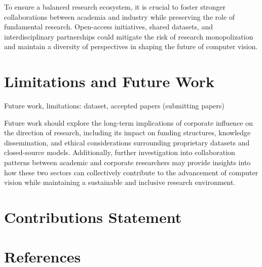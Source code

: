 \documentclass{article}
\begin{document}
To ensure a balanced research ecosystem, it is crucial to foster stronger collaborations between academia and industry while preserving the role of fundamental research. Open-access initiatives, shared datasets, and interdisciplinary partnerships could mitigate the risk of research monopolization and maintain a diversity of perspectives in shaping the future of computer vision. 

\section{Limitations and Future Work}

Future work, 
limitations: dataset, accepted papers (submitting papers)

Future work should explore the long-term implications of corporate influence on the direction of research, including its impact on funding structures, knowledge dissemination, and ethical considerations surrounding proprietary datasets and closed-source models. Additionally, further investigation into collaboration patterns between academic and corporate researchers may provide insights into how these two sectors can collectively contribute to the advancement of computer vision while maintaining a sustainable and inclusive research environment.


\section{Contributions Statement}



\section*{References}
\end{document}
